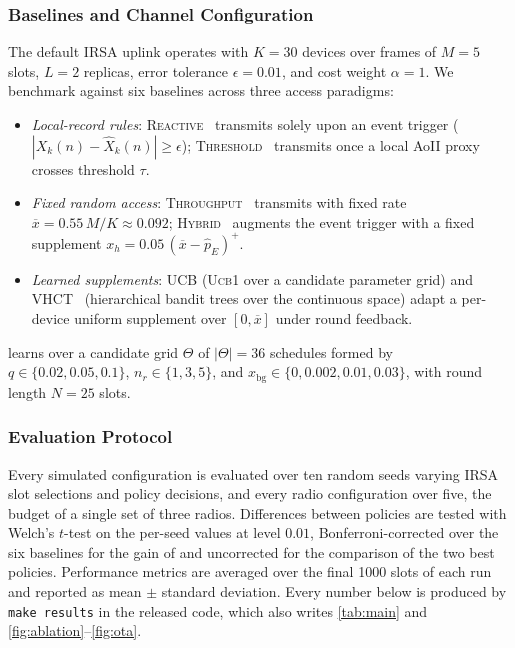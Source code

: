 \documentclass[conference]{IEEEtran}
\begin{document}
\subsubsection{Baselines and Channel Configuration}
  The default IRSA uplink operates with $K = 30$ devices over frames of $M = 5$ slots, $L = 2$ replicas, error tolerance $\epsilon = 0.01$, and cost weight $\alpha = 1$.
  We benchmark \tool against six baselines across three access paradigms:
  \begin{itemize}
    \item \emph{Local-record rules}: \textsc{Reactive}~\cite{munari2024monitoring} transmits solely upon an event trigger ($|X_k(n) - \hat{X}_k(n)| \ge \epsilon$); \textsc{Threshold}~\cite{nayak2023decentralized,mubarak2026threshold} transmits once a local AoII proxy crosses threshold $\tau$.
    \item \emph{Fixed random access}: \textsc{Throughput}~\cite{munari2024monitoring} transmits with fixed rate $\overline{x} = 0.55\,M/K \approx 0.092$; \textsc{Hybrid}~\cite{munari2024monitoring} augments the event trigger with a fixed supplement $x_h = 0.05\,(\overline{x} - \hat p_E)^+$.
    \item \emph{Learned supplements}: \textsc{UCB} (\textsc{Ucb1} over a candidate parameter grid) and \textsc{VHCT}~\cite{li2021optimum} (hierarchical bandit trees over the continuous space) adapt a per-device uniform supplement over $[0, \overline{x}]$ under round feedback.
  \end{itemize}
  \tool learns over a candidate grid $\Theta$ of $|\Theta| = 36$ schedules formed by $q \in \{0.02, 0.05, 0.1\}$, $n_r \in \{1, 3, 5\}$, and $x_{\mathrm{bg}} \in \{0, 0.002, 0.01, 0.03\}$, with round length $N = 25$ slots.

\subsubsection{Evaluation Protocol}
  Every simulated configuration is evaluated over ten random seeds varying IRSA slot selections and policy decisions, and every radio configuration over five, the budget of a single set of three radios.
  Differences between policies are tested with Welch's $t$-test on the per-seed values at level $0.01$, Bonferroni-corrected over the six baselines for the gain of \tool and uncorrected for the comparison of the two best policies.
  Performance metrics are averaged over the final 1000 slots of each run and reported as mean $\pm$ standard deviation.
  Every number below is produced by \texttt{make results} in the released code, which also writes \autoref{tab:main} and \autoref{fig:ablation}--\ref{fig:ota}.
\end{document}
